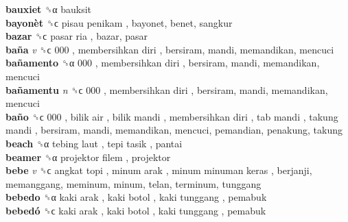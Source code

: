 \textbf{bauxiet} ␝α  bauksit  \\
\textbf{bayonèt} ␝ϲ   pisau penikam , bayonet, benet, sangkur  \\
\textbf{bazar} ␝ϲ   pasar ria , bazar, pasar  \\
\textbf{baña} \emph{v}  ␝ϲ   000 ,  membersihkan diri , bersiram, mandi, memandikan, mencuci  \\
\textbf{bañamento} ␝α   000 ,  membersihkan diri , bersiram, mandi, memandikan, mencuci  \\
\textbf{bañamentu} \emph{n}  ␝ϲ   000 ,  membersihkan diri , bersiram, mandi, memandikan, mencuci  \\
\textbf{baño} ␝ϲ   000 ,  bilik air ,  bilik mandi ,  membersihkan diri ,  tab mandi ,  takung mandi , bersiram, mandi, memandikan, mencuci, pemandian, penakung, takung  \\
\textbf{beach} ␝α   tebing laut ,  tepi tasik , pantai  \\
\textbf{beamer} ␝α   projektor filem , projektor  \\
\textbf{bebe} \emph{v}  ␝ϲ   angkat topi ,  minum arak ,  minum minuman keras , berjanji, memanggang, meminum, minum, telan, terminum, tunggang  \\
\textbf{bebedo} ␝α   kaki arak ,  kaki botol ,  kaki tunggang , pemabuk  \\
\textbf{bebedó} ␝ϲ   kaki arak ,  kaki botol ,  kaki tunggang , pemabuk  \\
